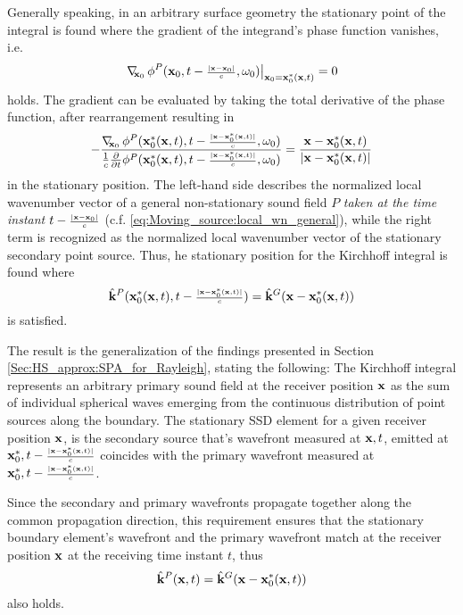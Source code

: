 Generally speaking, in an arbitrary surface geometry the stationary point of the integral is found where the gradient of the integrand's phase function vanishes, i.e.
\begin{equation}
\left. \nabla_{\!\!\mathbf{x}_0}\, \phi^P(\mathbf{x}_0,t-{\scriptstyle \frac{|\mathbf{x}-\mathbf{x}_0|}{c} },\omega_0) \right|_{\mathbf{x}_0 = \mathbf{x}_0^*(\mathbf{x},t)} = 0
\end{equation} 
holds.
The gradient can be evaluated by taking the total derivative of the phase function, after rearrangement resulting in
\begin{equation}
-\frac{\nabla_{\!\!\mathbf{x}_0}\, \phi^P(\mathbf{x}_0^*(\mathbf{x},t),t-{\scriptstyle \frac{|\mathbf{x}-\mathbf{x}_0^*(\mathbf{x},t)|}{c} },\omega_0) }{\frac{1}{c}\frac{\partial }{\partial t}\phi^P(\mathbf{x}_0^*(\mathbf{x},t),t-{\scriptstyle \frac{|\mathbf{x}-\mathbf{x}_0^*(\mathbf{x},t)|}{c} },\omega_0) } = \frac{\mathbf{x}-\mathbf{x}_0^*(\mathbf{x},t)}{|\mathbf{x}-\mathbf{x}_0^*(\mathbf{x},t)|}
\end{equation}
in the stationary position.
The left-hand side describes the normalized local wavenumber vector of a general non-stationary sound field $P$ \emph{taken at the time instant $t-{\scriptstyle \frac{|\mathbf{x}-\mathbf{x}_0|}{c} }$} (c.f. \eqref{eq:Moving_source:local_wn_general}), while the right term is recognized as the normalized local wavenumber vector of the stationary secondary point source. 
Thus, he stationary position for the Kirchhoff integral is found where
\begin{equation}
\label{Eq:moving_sources:moving_point_stat_point_1}
\hat{\mathbf{k}}^P(\mathbf{x}_0^*(\mathbf{x},t),t-{\scriptstyle \frac{|\mathbf{x}-\mathbf{x}_0^*(\mathbf{x},t)|}{c} }) = \hat{\mathbf{k}}^G(\mathbf{x}-\mathbf{x}_0^*(\mathbf{x},t))
\end{equation}
is satisfied.

The result is the generalization of the findings presented in Section \ref{Sec:HS_approx:SPA_for_Rayleigh}, stating the following:
The Kirchhoff integral represents an arbitrary primary sound field at the receiver position $\mathbf{x}$ as the sum of individual spherical waves emerging from the continuous distribution of point sources along the boundary.
The stationary SSD element for a given receiver position $\mathbf{x}$, is the secondary source that's wavefront measured at $\mathbf{x},t$, emitted at $\mathbf{x}_0^*, t-{\scriptstyle \frac{|\mathbf{x}-\mathbf{x}_0^*(\mathbf{x},t)|}{c} }$ coincides with the primary wavefront measured at $\mathbf{x}_0^*, t-{\scriptstyle \frac{|\mathbf{x}-\mathbf{x}_0^*(\mathbf{x},t)|}{c} }$.

Since the secondary and primary wavefronts propagate together along the common propagation direction, this requirement ensures that the stationary boundary element's wavefront and the primary wavefront match at the receiver position $\mathbf{x}$ at the receiving time instant $t$, thus 
\begin{equation}
\hat{\mathbf{k}}^P(\mathbf{x},t) = \hat{\mathbf{k}}^G(\mathbf{x}-\mathbf{x}_0^*(\mathbf{x},t))
\end{equation}
also holds.

